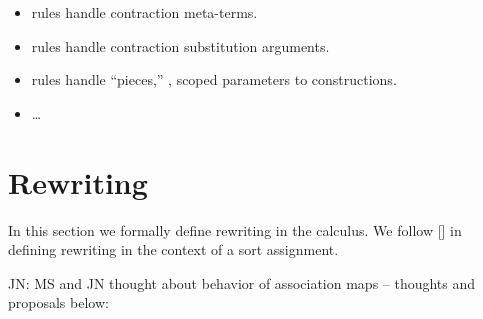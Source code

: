 \documentclass[letterpaper,11pt]{article}
\newcommand{\JN}[1]{\textcolor{orange!70!black}{JN: #1}}
\begin{document}
\begin{itemize}
\item {} rules handle contraction meta-terms. 

\item {} rules handle contraction substitution arguments. 

\item {} rules handle ``pieces,'' \ie, scoped parameters to constructions. 

\item {}…

\end{itemize}




\section{Rewriting}
\label{sec:rewriting}

In this section we formally define rewriting in the \hax calculus. We follow [] in
defining rewriting in the context of a sort assignment.

\bigskip
\JN{MS and JN thought about behavior of association maps -- thoughts and proposals below}:
\end{document}
